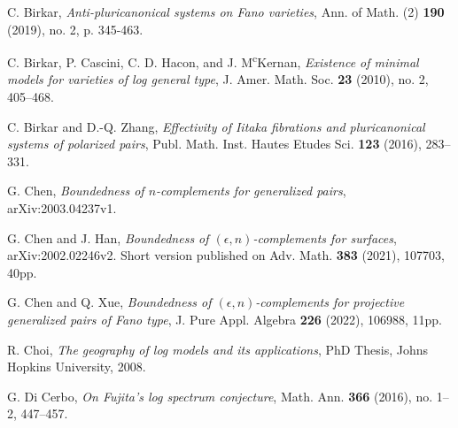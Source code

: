 \documentclass[11pt]{amsart}
\numberwithin{equation}{section}
\theoremstyle{definition}
\theoremstyle{definition}
\begin{document}
\begin{thebibliography}{99}

 C. Birkar,
\textit{Anti-pluricanonical systems on Fano varieties}, Ann. of Math. (2) \textbf{190} (2019), no. 2, p. 345-463.

C. Birkar, P. Cascini, C. D. Hacon, and J. M\textsuperscript{c}Kernan,  \textit{Existence of minimal models for varieties of log general type}, J. Amer. Math. Soc. {\bf 23} (2010), no. 2, 405--468.	
	




 C. Birkar and D.-Q. Zhang, \textit{Effectivity of Iitaka fibrations and pluricanonical systems of polarized pairs}, Publ. Math. Inst. Hautes Etudes Sci. \textbf{123} (2016), 283--331.

 G. Chen, \textit{Boundedness of $n$-complements for generalized pairs}, arXiv:2003.04237v1.


 G. Chen and J. Han, \textit{Boundedness of $(\epsilon,n)$-complements for surfaces}, arXiv:2002.02246v2. Short
version published on Adv. Math. \textbf{383} (2021), 107703, 40pp.


 G. Chen and Q. Xue, \textit{Boundedness of $(\epsilon,n)$-complements for projective generalized pairs of Fano type}, J. Pure Appl. Algebra \textbf{226} (2022), 106988, 11pp.

 R. Choi, \textit{The geography of log models and its applications}, PhD Thesis, Johns Hopkins University, 2008.

 G. Di Cerbo, \textit{On Fujita’s log spectrum conjecture}, Math. Ann. \textbf{366} (2016), no. 1--2, 447--457.




\end{thebibliography}
\end{document}
